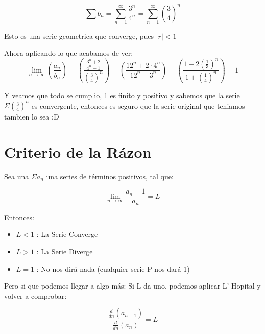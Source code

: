 \documentclass[12pt]{report}							    %
\begin{document}
    \begin{equation*}
        \sum b_n = \sum_{n=1}^{\infty} \frac{3^n}{4^n} = \sum_{n=1}^{\infty} \left( \frac{3}{4} \right)^n 
    \end{equation*}

    Esto es una serie geometrica que converge, pues $|r| < 1$

    Ahora aplicando lo que acabamos de ver:
    \begin{equation*}
        \lim_{n \to \infty} \left( \frac{a_n}{b_n} \right) = \left( \frac{ \frac{3^n+2}{4^n-1} }{ \left( \frac{3}{4} \right)^n  } \right) =  \left( \frac{12^n + 2 \cdot 4^n}{12^n -3^n} \right) = \left( \frac{1 + 2 (\frac{1}{3})^n}{1 +  (\frac{1}{4})^n} \right) = 1
    \end{equation*}

    Y veamos que todo se cumplio, 1 es finito y positivo y sabemos que la serie $\Sigma (\frac{3}{4})^n$ es convergente, entonces es seguro que la serie original que teniamos tambien lo sea :D



    \clearpage
    \section{Criterio de la Rázon}

    Sea una $\Sigma a_n$ una series de términos positivos, tal que:

    \begin{equation}
        \lim_{n \to \infty} \frac{a_n+1}{a_n} = L
    \end{equation}

    Entonces:
    \begin{itemize}
        \item $L < 1$ : La Serie Converge
        \item $L > 1$ : La Serie Diverge
        \item $L = 1$ : No nos dirá nada (cualquier serie P nos dará 1)
    \end{itemize}

    Pero si que podemos llegar a algo más:
    Si L da uno, podemos aplicar L' Hopital y volver a comprobar:

    \begin{equation}
    \frac{\frac{d}{dn} (a_{n+1})}{\frac{d}{dn} (a_n)} = L
    \end{equation}
\end{document}
